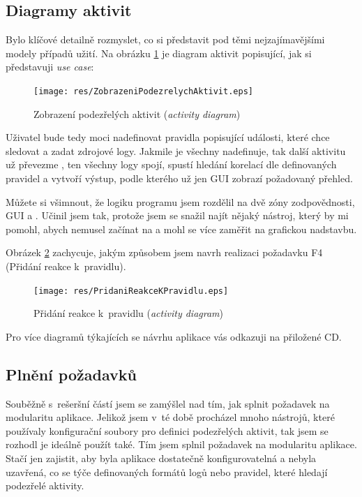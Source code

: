 \documentclass[thesis=B,czech]{FITthesis}[2012/06/26]
\begin{document}
\subsection{Diagramy aktivit}
Bylo klíčové detailně rozmyslet, co si představit pod těmi nejzajímavějšími modely případů užití. Na obrázku \ref{fig:ZobrazeniPodezrelychAktivit} je diagram aktivit popisující, jak si představuji \textit{use case}: 

\begin{figure}[h]
  \centering
  \texttt{[image: res/ZobrazeniPodezrelychAktivit.eps]}
  \caption{Zobrazení podezřelých aktivit (\textit{activity diagram})}
  \label{fig:ZobrazeniPodezrelychAktivit}
\end{figure}

Uživatel bude tedy moci nadefinovat pravidla popisující události, které chce sledovat a zadat zdrojové logy. Jakmile je všechny nadefinuje, tak další aktivitu už převezme , ten všechny logy spojí, spustí hledání korelací dle definovaných pravidel a vytvoří výstup, podle kterého už jen GUI zobrazí požadovaný přehled. 

Můžete si všimnout, že logiku programu jsem rozdělil na dvě zóny zodpovědnosti, GUI a . Učinil jsem tak, protože jsem se snažil najít nějaký nástroj, který by mi pomohl, abych nemusel začínat na  a mohl se více zaměřit na grafickou nadstavbu.

Obrázek \ref{fig:PridaniReakceKPravidlu} zachycuje, jakým způsobem jsem navrh realizaci požadavku F4 (Přidání reakce k~pravidlu).

\begin{figure}[h]
  \centering
  \texttt{[image: res/PridaniReakceKPravidlu.eps]}
  \caption{Přidání reakce k~pravidlu (\textit{activity diagram})}
  \label{fig:PridaniReakceKPravidlu}
\end{figure}

Pro více diagramů týkajících se návrhu aplikace vás odkazuji na přiložené CD.

\subsection{Plnění požadavků}
Souběžně s~rešeršní částí jsem se zamýšlel nad tím, jak splnit požadavek na modularitu aplikace. Jelikož jsem v~té době procházel mnoho nástrojů, které používaly konfigurační soubory pro definici podezřelých aktivit, tak jsem se rozhodl je ideálně použít také. Tím jsem splnil požadavek na modularitu aplikace. Stačí jen zajistit, aby byla aplikace dostatečně konfigurovatelná a nebyla uzavřená, co se týče definovaných formátů logů nebo pravidel, které hledají podezřelé aktivity.
\end{document}
